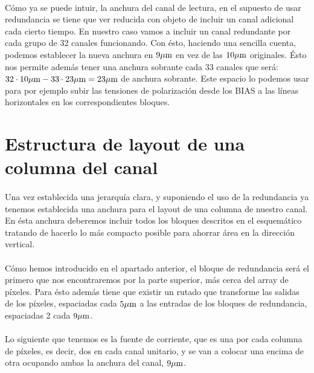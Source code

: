 \paragraph{}
Cómo ya se puede intuir, la anchura del canal de lectura, en el supuesto de usar
redundancia se tiene que ver reducida con objeto de incluir un canal adicional
cada cierto tiempo. En nuestro caso vamos a incluir un canal redundante por cada
grupo de 32 canales funcionando. Con ésto, haciendo una sencilla cuenta, podemos
establecer la nueva anchura en $9\mu\text{m}$ en vez de las $10\mu\text{m}$ originales. Ésto nos
permite además tener una anchura sobrante cada 33 canales que será:
$32\cdot 10\mu\text{m} - 33\cdot 23\mu\text{m} = 23\mu\text{m}$ de anchura sobrante. Este espacio lo
podemos usar para por ejemplo subir las tensiones de polarización desde los BIAS
a las líneas horizontales en los correspondientes bloques.

\section{Estructura de layout de una columna del canal}

\paragraph{}
Una vez establecida una jerarquía clara, y suponiendo el uso de la redundancia ya
tenemos establecida una anchura para el layout de una columna de nuestro canal.
En ésta anchura deberemos incluir todos los bloques descritos en el esquemático
tratando de hacerlo lo más compacto posible para ahorrar área en la dirección vertical.

\paragraph{}
Cómo hemos introducido en el apartado anterior, el bloque de redundancia será
el primero que nos encontraremos por la parte superior, más cerca del array de
píxeles. Para ésto además tiene que existir un rutado que transforme las salidas
de los píxeles, espaciadas cada $5\mu\text{m}$ a las entradas de los bloques de redundancia,
espaciadas 2 cada $9\mu\text{m}$.

\paragraph{}
Lo siguiente que tenemos es la fuente de corriente, que es una por cada columna
de píxeles, es decir, dos en cada canal unitario, y se van a colocar una encima
de otra ocupando ambas la anchura del canal, $9\mu\text{m}$.

